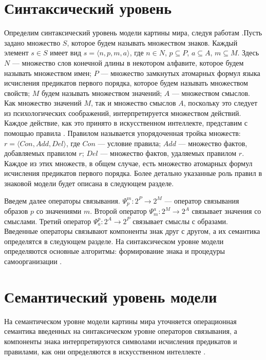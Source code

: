 \documentclass[12pt]{scrartcl}
\begin{document}
	\section{Синтаксический уровень}\label{sec:sintaxis}

	Определим синтаксический уровень модели картины мира, следуя работам \cite{Osipov2014c,Osipov2016c}.Пусть задано множество $S$, которое будем называть множеством знаков. Каждый элемент $s\in S$ имеет вид $s=\langle n,p,m,a\rangle$, где $n\in N$, $p\subseteq P$, $a\subseteq A$, $m\subseteq M$. Здесь $N$ --- множество слов конечной длины в некотором алфавите, которое будем называть множеством имен; $P$ --- множество замкнутых атомарных формул языка исчисления предикатов первого порядка, которое будем называть множеством свойств; $M$ будем называть множеством значений; $A$ — множеством смыслов. Как множество значений $M$, так и множество смыслов $A$, поскольку это следует из психологических соображений, интерпретируется множеством действий. Каждое действие, как это принято в искусственном интеллекте, представим с помощью правила \cite{Osipov2008b}. Правилом называется упорядоченная тройка множеств:	$r=\langle Con,Add,Del\rangle$, где $Con$ --- условие правила; $Add$ --- множество фактов, добавляемых правилом $r$; $Del$ --- множество фактов, удаляемых правилом $r$. Каждое из этих множеств, в общем случае, есть множество атомарных формул исчисления предикатов первого порядка. Более детально указанные роль правил в знаковой модели будет описана в следующем разделе.
	
	Введем далее операторы связывания. $\Psi_p^m:2^P\rightarrow 2^M$ --- оператор связывания образов $p$ со значениями $m$. Второй оператор	$\Psi_m^a:2^M\rightarrow 2^A$ связывает значения со	смыслами. Третий оператор $\Psi_a^p: 2^A\rightarrow 2^P$ связывает смыслы с образами. Введенные операторы связывают компоненты знак друг с другом, а их семантика определятся в следующем разделе. На синтаксическом уровне модели определяются основные алгоритмы: формирование знака и процедуры самоорганизации \cite{Osipov2014c}.
		

	\section{Семантический уровень модели}\label{sec:semantic}
	
	На семантическом уровне модели картины мира уточняется операционная семантика введенных на синтаксическом уровне операторов связывания, а компоненты знака интерпретируются символами исчисления предикатов и правилами, как они определяются в искусственном интеллекте \cite{Osipov2015c,Osipov2016a}.
	
\end{document}
